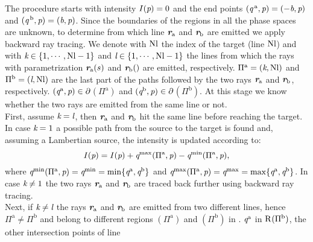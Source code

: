 The procedure starts with intensity $I(\textit{p})=0$ and the end points $(\textit{q}^{\,\textrm{a}}, \textit{p})= (-\textit{b}, \textit{p})$ and $(\textit{q}^{\,\textrm{b}}, \textit{p}) = (\textit{b}, \textit{p})$. Since the boundaries of the regions in all the phase spaces are unknown, to determine from which line $\textit{\textbf{r}}_{\textrm{a}}$ and $\textit{\textbf{r}}_{\textrm{b}}$ are emitted we apply backward ray tracing. We denote with $\textrm{Nl}$ the index of the target (line $\textrm{Nl}$) and with $\textit{k}\in\{1,\cdots, \textrm{Nl}-1\}$ and $\textit{l}\in\{1,\cdots, \textrm{Nl}-1\}$ the lines from which the rays with parametrization $\textit{\textbf{r}}_{\textrm{a}}(s)$ and $\textit{\textbf{r}}_{\textrm{b}}()$ are emitted, respectively. $\Pi^\textrm{a} = (\textit{k}, \textrm{Nl})$ and $\Pi^\textrm{b} = (\textit{l},\textrm{Nl})$ are the last part of the paths followed by the two rays $\textit{\textbf{r}}_{\textrm{a}}$ and $\textit{\textbf{r}}_{\textrm{b}}$, respectively. $(\textit{q}^{\textrm{a}}, \textit{p})\in\partial$$(\Pi^{\textrm{a}})$ and $(\textit{q}^{\textrm{b}}, \textit{p})\in\partial$$(\Pi^{\textrm{b}})$. At this stage we know whether the two rays are emitted from the same line or not. \\ \indent 
First, assume $\textit{k}= \textit{l}$, then $\textit{\textbf{r}}_{\textrm{a}}$ and $\textit{\textbf{r}}_{\textrm{b}}$ hit the same line before reaching the target. 
In case $\textit{k} = 1$ a possible path from the source to the target is found and, assuming a Lambertian source, the intensity is updated according to:
\begin{equation}\label{eq:intensity_brm}
I(\textit{p}) = I(\textit{p})+\textit{q}^{\textrm{max}}(\Pi^\textrm{a}, \textit{p})-\textit{q}^{\textrm{min}}(\Pi^\textrm{a}, \textit{p}),
\end{equation}
where $\textit{q}^{\textrm{min}}(\Pi^\textrm{a}, \textit{p}) = \textit{q}^{\textrm{min}} = \min\{\textit{q}^{\textrm{a}}, \textit{q}^{\textrm{b}}\}$ and $\textit{q}^{\textrm{max}}(\Pi^\textrm{a}, \textit{p}) = \textit{q}^{\textrm{max}} = \max\{\textit{q}^{\textrm{a}}, \textit{q}^{\textrm{b}}\}$. In case $\textit{k}\neq 1$ the two rays $\textit{\textbf{r}}_{\textrm{a}}$ and $\textit{\textbf{r}}_{\textrm{b}}$ are traced back further using backward ray tracing.
\\ \indent Next, if $\textit{k}\neq \textit{l}$ the rays $\textit{\textbf{r}}_\textrm{a}$ and $\textit{\textbf{r}}_\textrm{b}$ are emitted from two different lines, hence $\Pi^{\textrm{a}}\neq \Pi^{\textrm{b}}$ and belong to different regions $(\Pi^{\textrm{a}})$ and $(\Pi^{\textrm{b}})$ in . $\textit{q}^{\textrm{a}}$ in $\mbox{$\textup{R}_{\textit{}}$}(\Pi^{\textrm{b}})$, the other intersection points of line 

